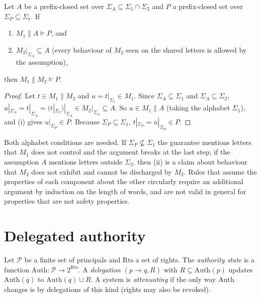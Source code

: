 \begin{newresult}\label{prop:assume-guarantee}
Let $A$ be a prefix-closed set over $\Sigma_A\subseteq\Sigma_1\cap\Sigma_2$ and $P$ a prefix-closed set over $\Sigma_P\subseteq\Sigma_1$. If
\begin{enumerate}[nosep,label=(\roman*)]
  \item $M_1\|A\models P$, and
  \item $M_2|_{\Sigma_A}\subseteq A$ (every behaviour of $M_2$ seen on the shared letters is allowed by the assumption),
\end{enumerate}
then $M_1\|M_2\models P$.
\end{newresult}
\begin{proof}
Let $t\in M_1\|M_2$ and $u=t|_{\Sigma_1}\in M_1$. Since $\Sigma_A\subseteq\Sigma_1$ and $\Sigma_A\subseteq\Sigma_2$, $u|_{\Sigma_A}=t|_{\Sigma_A}=(t|_{\Sigma_2})|_{\Sigma_A}\in M_2|_{\Sigma_A}\subseteq A$. So $u\in M_1\|A$ (taking the alphabet $\Sigma_1$), and (i) gives $u|_{\Sigma_P}\in P$. Because $\Sigma_P\subseteq\Sigma_1$, $t|_{\Sigma_P}=u|_{\Sigma_P}\in P$.
\end{proof}

Both alphabet conditions are needed. If $\Sigma_P\not\subseteq\Sigma_1$ the guarantee mentions letters that $M_1$ does not control and the argument breaks at the last step; if the assumption $A$ mentions letters outside $\Sigma_2$, then (ii) is a claim about behaviour that $M_2$ does not exhibit and cannot be discharged by $M_2$. Rules that assume the properties of each component about the other circularly require an additional argument by induction on the length of words, and are not valid in general for properties that are not safety properties.

\section{Delegated authority}

\begin{definition}\label{def:delegation}
Let $\mathcal P$ be a finite set of principals and $\mathrm{Rts}$ a set of rights. The \emph{authority state} is a function $\mathrm{Auth}:\mathcal P\to2^{\mathrm{Rts}}$. A \emph{delegation} $(p\to q,R)$ with $R\subseteq\mathrm{Auth}(p)$ updates $\mathrm{Auth}(q)$ to $\mathrm{Auth}(q)\cup R$. A system is \emph{attenuating} if the only way $\mathrm{Auth}$ changes is by delegations of this kind (rights may also be revoked).
\end{definition}

